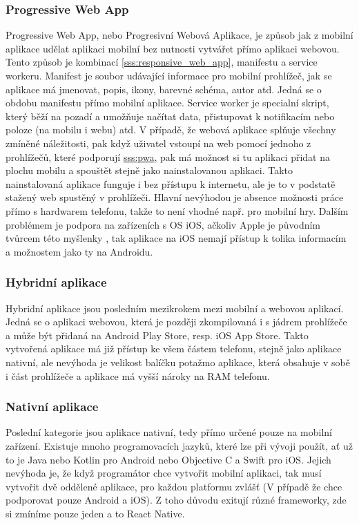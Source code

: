 \subsubsection{Progressive Web App}
\label{sss:pwa}
Progressive Web App, nebo Progresivní Webová Aplikace, je způsob jak z mobilní aplikace udělat aplikaci mobilní bez nutnosti vytvářet přímo aplikaci webovou. Tento způsob je kombinací \ref{sss:responsive_web_app}, manifestu a service workeru. Manifest je soubor udávající informace pro mobilní prohlížeč, jak se aplikace má jmenovat, popis, ikony, barevné schéma, autor atd. Jedná se o obdobu manifestu přímo mobilní aplikace. Service worker je specialní skript, který běží na pozadí a umožňuje načítat data, přistupovat k notifikacím nebo poloze (na mobilu i webu) atd. V případě, že webová aplikace splňuje všechny zmíněné náležitosti, pak když uživatel vstoupí na web pomocí jednoho z prohlížečů, které podporují \hyperref[PWA]{sss:pwa}, pak má možnost si tu aplikaci přidat na plochu mobilu a spouštět stejně jako nainstalovanou aplikaci. Takto nainstalovaná aplikace funguje i bez přístupu k internetu, ale je to v podstatě stažený web spustěný v prohlížeči. Hlavní nevýhodou je absence možnosti práce přímo s hardwarem telefonu, takže to není vhodné např. pro mobilní hry. Dalším problémem je podpora na zařízeních s OS iOS, ačkoliv Apple je původním tvůrcem této myšlenky \cite{ritchie_2018_app}, tak aplikace na iOS nemají přístup k tolika informacím a možnostem jako ty na Androidu.

\subsubsection{Hybridní aplikace}
Hybridní aplikace jsou posledním mezikrokem mezi mobilní a webovou aplikací. Jedná se o aplikaci webovou, která je později zkompilovaná i s jádrem prohlížeče a může být přidaná na Android Play Store, resp. iOS App Store. Takto vytvořená aplikace má již přístup ke všem částem telefonu, stejně jako aplikace nativní, ale nevýhoda je velikost balíčku potažmo aplikace, která obsahuje v sobě i část prohlížeče a aplikace má vyšší nároky na RAM telefonu.

\subsubsection{Nativní aplikace}
Poslední kategorie jsou aplikace nativní, tedy přímo určené pouze na mobilní zařízení. Existuje mnoho programovacích jazyků, které lze při vývoji použít, ať už to je Java nebo Kotlin pro Android nebo Objective C a Swift pro iOS. Jejich nevýhoda je, že když programátor chce vytvořit mobilní aplikaci, tak musí vytvořit dvě oddělené aplikace, pro každou platformu zvlášť (V případě že chce podporovat pouze Android a iOS). Z toho důvodu exitují různé frameworky, zde si zmíníme pouze jeden a to React Native.

